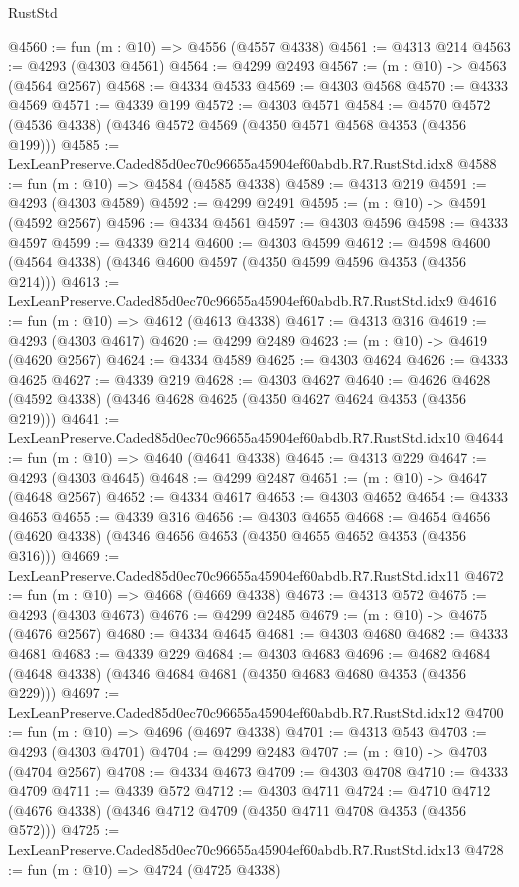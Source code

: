 \begin{lexlean}{RustStd}
\begin{coremodule}
@4560 := fun (m : @10) => @4556 (@4557 @4338)
@4561 := @4313 @214
@4563 := @4293 (@4303 @4561)
@4564 := @4299 @2493
@4567 := (m : @10) -> @4563 (@4564 @2567)
@4568 := @4334 @4533
@4569 := @4303 @4568
@4570 := @4333 @4569
@4571 := @4339 @199
@4572 := @4303 @4571
@4584 := @4570 @4572 (@4536 @4338) (@4346 @4572 @4569 (@4350 @4571 @4568 @4353 (@4356 @199)))
@4585 := LexLeanPreserve.Caded85d0ec70c96655a45904ef60abdb.R7.RustStd.idx8
@4588 := fun (m : @10) => @4584 (@4585 @4338)
@4589 := @4313 @219
@4591 := @4293 (@4303 @4589)
@4592 := @4299 @2491
@4595 := (m : @10) -> @4591 (@4592 @2567)
@4596 := @4334 @4561
@4597 := @4303 @4596
@4598 := @4333 @4597
@4599 := @4339 @214
@4600 := @4303 @4599
@4612 := @4598 @4600 (@4564 @4338) (@4346 @4600 @4597 (@4350 @4599 @4596 @4353 (@4356 @214)))
@4613 := LexLeanPreserve.Caded85d0ec70c96655a45904ef60abdb.R7.RustStd.idx9
@4616 := fun (m : @10) => @4612 (@4613 @4338)
@4617 := @4313 @316
@4619 := @4293 (@4303 @4617)
@4620 := @4299 @2489
@4623 := (m : @10) -> @4619 (@4620 @2567)
@4624 := @4334 @4589
@4625 := @4303 @4624
@4626 := @4333 @4625
@4627 := @4339 @219
@4628 := @4303 @4627
@4640 := @4626 @4628 (@4592 @4338) (@4346 @4628 @4625 (@4350 @4627 @4624 @4353 (@4356 @219)))
@4641 := LexLeanPreserve.Caded85d0ec70c96655a45904ef60abdb.R7.RustStd.idx10
@4644 := fun (m : @10) => @4640 (@4641 @4338)
@4645 := @4313 @229
@4647 := @4293 (@4303 @4645)
@4648 := @4299 @2487
@4651 := (m : @10) -> @4647 (@4648 @2567)
@4652 := @4334 @4617
@4653 := @4303 @4652
@4654 := @4333 @4653
@4655 := @4339 @316
@4656 := @4303 @4655
@4668 := @4654 @4656 (@4620 @4338) (@4346 @4656 @4653 (@4350 @4655 @4652 @4353 (@4356 @316)))
@4669 := LexLeanPreserve.Caded85d0ec70c96655a45904ef60abdb.R7.RustStd.idx11
@4672 := fun (m : @10) => @4668 (@4669 @4338)
@4673 := @4313 @572
@4675 := @4293 (@4303 @4673)
@4676 := @4299 @2485
@4679 := (m : @10) -> @4675 (@4676 @2567)
@4680 := @4334 @4645
@4681 := @4303 @4680
@4682 := @4333 @4681
@4683 := @4339 @229
@4684 := @4303 @4683
@4696 := @4682 @4684 (@4648 @4338) (@4346 @4684 @4681 (@4350 @4683 @4680 @4353 (@4356 @229)))
@4697 := LexLeanPreserve.Caded85d0ec70c96655a45904ef60abdb.R7.RustStd.idx12
@4700 := fun (m : @10) => @4696 (@4697 @4338)
@4701 := @4313 @543
@4703 := @4293 (@4303 @4701)
@4704 := @4299 @2483
@4707 := (m : @10) -> @4703 (@4704 @2567)
@4708 := @4334 @4673
@4709 := @4303 @4708
@4710 := @4333 @4709
@4711 := @4339 @572
@4712 := @4303 @4711
@4724 := @4710 @4712 (@4676 @4338) (@4346 @4712 @4709 (@4350 @4711 @4708 @4353 (@4356 @572)))
@4725 := LexLeanPreserve.Caded85d0ec70c96655a45904ef60abdb.R7.RustStd.idx13
@4728 := fun (m : @10) => @4724 (@4725 @4338)

\end{coremodule}
\end{lexlean}
